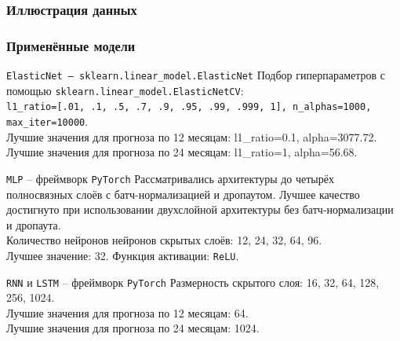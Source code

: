 \documentclass[aspectratio=169,8pt]{beamer}
\begin{document}
\begin{frame}
\frametitle{Иллюстрация данных}

\begin{figure}[h!]
        \captionsetup{labelformat=empty}
        \vspace{-2.3em}
        \caption[scale=0.25]{}
\end{figure}


\end{frame}

\begin{frame}
\frametitle{Применённые модели}
\begin{block}{\texttt{ElasticNet -- sklearn.linear\_model.ElasticNet}}
Подбор гиперпараметров с помощью \texttt{sklearn.linear\_model.ElasticNetCV}:\\
\texttt{l1\_ratio=[.01, .1, .5, .7, .9, .95, .99, .999, 1], n\_alphas=1000, max\_iter=10000}.\\
Лучшие значения для прогноза по 12 месяцам: l1\_ratio=0.1, alpha=3077.72.\\
Лучшие значения для прогноза по 24 месяцам: l1\_ratio=1, alpha=56.68.
\end{block}

\begin{block}{\texttt{MLP} -- фреймворк \texttt{PyTorch}}
Рассматривались архитектуры до четырёх полносвязных слоёв с батч-нормализацией и дропаутом. Лучшее качество достигнуто при использовании двухслойной архитектуры без батч-нормализации и дропаута.\\
Количество нейронов  нейронов скрытых слоёв: 12, 24, 32, 64, 96.\\
Лучшее значение: 32. Функция активации: \texttt{ReLU}.
\end{block}

\begin{block}{\texttt{RNN} и \texttt{LSTM} -- фреймворк \texttt{PyTorch}}
Размерность скрытого слоя: 16, 32, 64, 128, 256, 1024.\\
Лучшие значения для прогноза по 12 месяцам: 64.\\
Лучшие значения для прогноза по 24 месяцам: 1024.\\
\end{block}


\end{frame}
\end{document}
